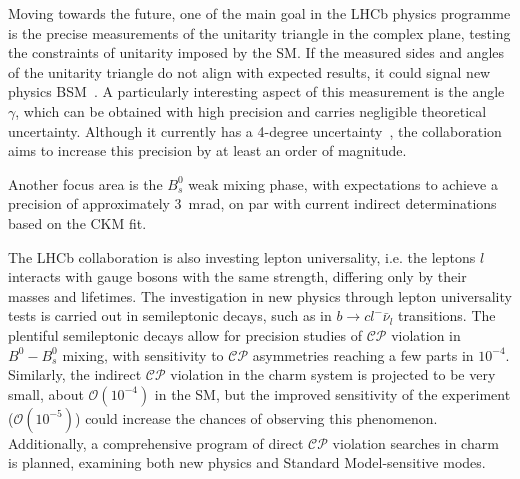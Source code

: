 Moving towards the future, one of the main goal in the LHCb physics programme is the precise measurements of the unitarity triangle in the complex plane, testing the constraints of unitarity imposed by the SM. If the measured sides and angles of the unitarity triangle do not align with expected results, it could signal new physics BSM~\cite{PhysRevLett.10.531, 10.1143/PTP.49.652}.
A particularly interesting aspect of this measurement is the angle $\gamma$, which can be obtained with high precision and carries negligible theoretical uncertainty. Although it currently has a 4-degree uncertainty~\cite{LHCb:2021dcr}, the collaboration aims to increase this precision by at least an order of magnitude. 

Another focus area is the $B_s^0$ weak mixing phase, with expectations to achieve a precision of approximately \SI{3}{\milli\radian}, on par with current indirect determinations based on the CKM fit.

The LHCb collaboration is also investing lepton universality, i.e. the leptons $l$ interacts with gauge bosons with the same strength, differing only by their masses and lifetimes.
The investigation in new physics through lepton universality tests is carried out in semileptonic decays, such as in $b\rightarrow c l^-\bar{\nu}_l$ transitions. The plentiful semileptonic decays allow for precision studies of $\mathcal{CP}$ violation in $B^0-B^0_s$ mixing, with sensitivity to $\mathcal{CP}$ asymmetries reaching a few parts in $10^{−4}$. Similarly, the indirect $\mathcal{CP}$ violation in the charm system is projected to be very small, about $\mathcal{O}(10^{-4})$ in the SM, but the improved sensitivity of the experiment ($\mathcal{O}(10^{−5})$) could increase the chances of observing this phenomenon. Additionally, a comprehensive program of direct $\mathcal{CP}$ violation searches in charm is planned, examining both new physics and Standard Model-sensitive modes.




